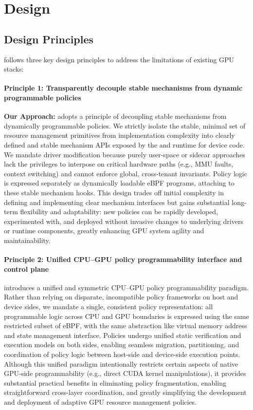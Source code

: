 \section{\sys Design}

\subsection{Design Principles}

\sys follows three key design principles to address the limitations of existing GPU stacks:

\paragraph{Principle 1: Transparently decouple stable mechanisms from dynamic programmable policies}
\noindent\textbf{Our Approach:} \sys adopts a principle of decoupling stable mechanisms from dynamically programmable policies. We strictly isolate the stable, minimal set of resource management primitives from implementation complexity into clearly defined and stable mechanism APIs exposed by the \sysdriver and runtime for device code. We mandate driver modification because purely user-space or sidecar approaches lack the privileges to interpose on critical hardware paths (e.g., MMU faults, context switching) and cannot enforce global, cross-tenant invariants. Policy logic is expressed separately as dynamically loadable eBPF programs, attaching to these stable mechanism hooks. This design trades off initial complexity in defining and implementing clear mechanism interfaces but gains substantial long-term flexibility and adaptability: new policies can be rapidly developed, experimented with, and deployed without invasive changes to underlying drivers or runtime components, greatly enhancing GPU system agility and maintainability.

\paragraph{Principle 2: Unified CPU--GPU policy programmability interface and control plane}
\sys introduces a unified and symmetric CPU--GPU policy programmability paradigm. Rather than relying on disparate, incompatible policy frameworks on host and device sides, we mandate a single, consistent policy representation: all programmable logic across CPU and GPU boundaries is expressed using the same restricted subset of eBPF, with the same abstraction like virtual memory address and state management interface. Policies undergo unified static verification and execution models on both sides, enabling seamless migration, partitioning, and coordination of policy logic between host-side and device-side execution points. Although this unified paradigm intentionally restricts certain aspects of native GPU-side programmability (e.g., direct CUDA kernel manipulations), it provides substantial practical benefits in eliminating policy fragmentation, enabling straightforward cross-layer coordination, and greatly simplifying the development and deployment of adaptive GPU resource management policies.


